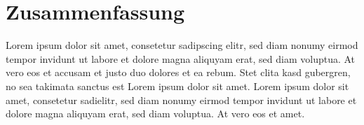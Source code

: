 \section*{Zusammenfassung}

Lorem ipsum dolor sit amet, consetetur sadipscing elitr, sed diam nonumy eirmod
tempor invidunt ut labore et dolore magna aliquyam erat, sed diam voluptua. At
vero eos et accusam et justo duo dolores et ea rebum. Stet clita kasd gubergren,
no sea takimata sanctus est Lorem ipsum dolor sit amet. Lorem ipsum dolor sit
amet, consetetur sadielitr, sed diam nonumy eirmod tempor invidunt ut labore et
dolore magna aliquyam erat, sed diam voluptua. At vero eos et amet.